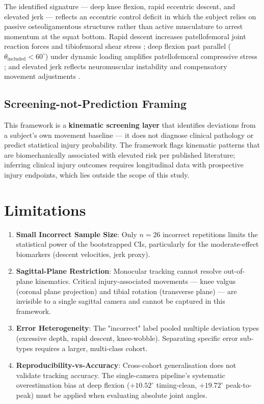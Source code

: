 The identified signature — deep knee flexion, rapid eccentric descent, and elevated jerk — reflects an eccentric control deficit in which the subject relies on passive osteoligamentous structures rather than active musculature to arrest momentum at the squat bottom. Rapid descent increases patellofemoral joint reaction forces and tibiofemoral shear stress \citep{Powers_2003}; deep flexion past parallel ($\theta_{\text{included}} < 60^\circ$) under dynamic loading amplifies patellofemoral compressive stress \citep{Wallace_2002}; and elevated jerk reflects neuromuscular instability and compensatory movement adjustments \citep{Farrokhi_2008}.

\subsection{Screening-not-Prediction Framing}
\label{sec:4-4-2-screening-not-prediction-framing}

This framework is a \textbf{kinematic screening layer} that identifies deviations from a subject's own movement baseline — it does not diagnose clinical pathology or predict statistical injury probability. The framework flags kinematic patterns that are biomechanically associated with elevated risk per published literature; inferring clinical injury outcomes requires longitudinal data with prospective injury endpoints, which lies outside the scope of this study.



\section{Limitations}
\label{sec:4-5-limitations}


\begin{enumerate}
  \item \textbf{Small Incorrect Sample Size}: Only $n = 26$ incorrect repetitions limits the statistical power of the bootstrapped CIs, particularly for the moderate-effect biomarkers (descent velocities, jerk proxy).
  \item \textbf{Sagittal-Plane Restriction}: Monocular tracking cannot resolve out-of-plane kinematics. Critical injury-associated movements — knee valgus (coronal plane projection) and tibial rotation (transverse plane) — are invisible to a single sagittal camera and cannot be captured in this framework.
  \item \textbf{Error Heterogeneity}: The "incorrect" label pooled multiple deviation types (excessive depth, rapid descent, knee-wobble). Separating specific error sub-types requires a larger, multi-class cohort.
  \item \textbf{Reproducibility-vs-Accuracy}: Cross-cohort generalisation does not validate tracking accuracy. The single-camera pipeline's systematic overestimation bias at deep flexion ($+10.52^\circ$ timing-clean, $+19.72^\circ$ peak-to-peak) must be applied when evaluating absolute joint angles.
\end{enumerate}



